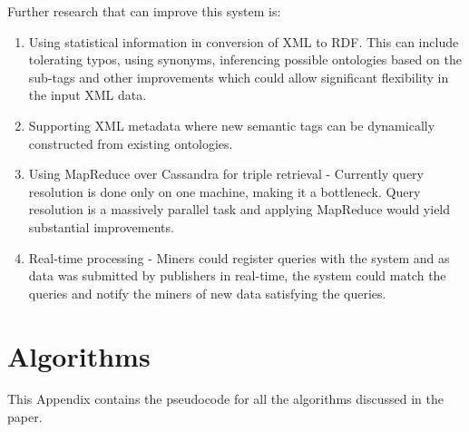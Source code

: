 \documentclass[journal]{IEEEtran}
\begin{document}
Further research that can improve this system is:
\begin{enumerate}

    \item Using statistical information in conversion of XML to RDF. This can
        include tolerating typos, using synonyms, inferencing possible
        ontologies based on the sub-tags and other improvements which could
        allow significant flexibility in the input XML data.

    \item Supporting XML metadata where new semantic tags can be dynamically
        constructed from existing ontologies.

    \item Using MapReduce over Cassandra for triple retrieval - Currently query
        resolution is done only on one machine, making it a bottleneck. Query
        resolution is a massively parallel task and applying
        MapReduce\cite{hus09hadoop} would
        yield substantial improvements.

    \item Real-time processing - Miners could register queries with the system
        and as data was submitted by publishers in real-time, the system could
        match the queries and notify the miners of new data satisfying the
        queries.
\end{enumerate}

\pagebreak
\appendix
\section{Algorithms}
This Appendix contains the pseudocode for all the algorithms discussed in the paper.
\end{document}
